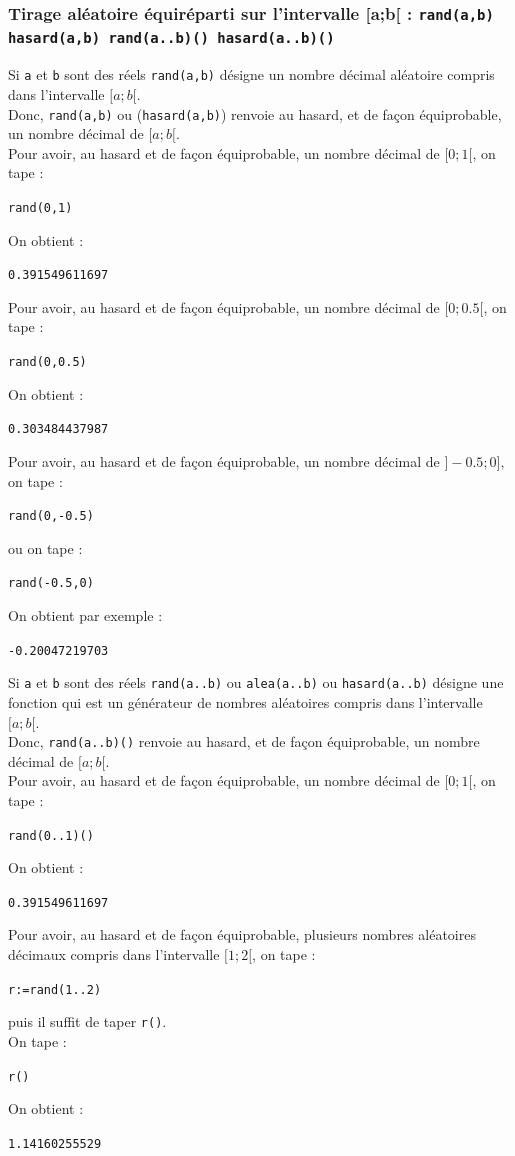 \documentclass[a4paper,11pt]{book}
\begin{document}
\subsubsection{Tirage al\'eatoire \'equir\'eparti sur l'intervalle [a;b[ : {\tt rand(a,b) hasard(a,b) rand(a..b)() hasard(a..b)()}}
Si {\tt a} et {\tt b} sont des r\'eels {\tt rand(a,b)} d\'esigne un nombre d\'ecimal
 al\'eatoire compris dans l'intervalle $[a;b[$.\\
Donc, {\tt rand(a,b)} ou ({\tt hasard(a,b)}) renvoie au hasard, et de fa\c{c}on 
\'equiprobable, un nombre d\'ecimal de $[a;b[$.\\
Pour avoir, au hasard et de fa\c{c}on \'equiprobable, un nombre d\'ecimal de $[0;1[$, 
on tape :
\begin{center}{\tt rand(0,1)}\end{center}
On obtient :
\begin{center}{\tt  0.391549611697}\end{center}
Pour avoir, au hasard et de fa\c{c}on \'equiprobable, un nombre d\'ecimal de $[0;0.5[$, 
on tape :
\begin{center}{\tt rand(0,0.5)}\end{center}
On obtient :
\begin{center}{\tt  0.303484437987}\end{center}
Pour avoir, au hasard et de fa\c{c}on \'equiprobable, un nombre d\'ecimal de $]-0.5;0]$, 
on tape :
\begin{center}{\tt rand(0,-0.5)}\end{center}
ou on tape :
\begin{center}{\tt rand(-0.5,0)}\end{center}
On obtient par exemple :
\begin{center}{\tt  -0.20047219703}\end{center}

Si {\tt a} et {\tt b} sont des r\'eels {\tt rand(a..b)} ou {\tt alea(a..b)} ou 
{\tt hasard(a..b)} d\'esigne une fonction qui est un  g\'en\'erateur de nombres al\'eatoires 
compris dans l'intervalle $[a;b[$.\\
Donc, {\tt rand(a..b)()} renvoie au hasard, et de fa\c{c}on \'equiprobable, un
 nombre d\'ecimal de $[a;b[$.\\
Pour avoir, au hasard et de fa\c{c}on \'equiprobable, un nombre d\'ecimal de $[0;1[$, 
on tape :
\begin{center}{\tt rand(0..1)()}\end{center}
On obtient :
\begin{center}{\tt  0.391549611697}\end{center}
Pour avoir, au hasard et de fa\c{c}on \'equiprobable, plusieurs nombres 
al\'eatoires d\'ecimaux compris dans l'intervalle $[1;2[$, 
on tape :
\begin{center}{\tt r:=rand(1..2)}\end{center}
puis il suffit de taper {\tt r()}.\\
On tape :
\begin{center}{\tt r()}\end{center}
On obtient :
\begin{center}{\tt 1.14160255529}\end{center}
\end{document}
